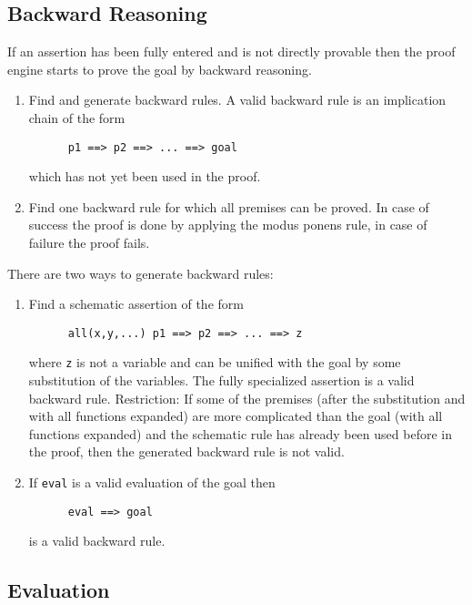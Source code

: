 \subsection{Backward Reasoning}

If an assertion has been fully entered and is not directly provable then the
proof engine starts to prove the goal by backward reasoning.

\begin{enumerate}
\item Find and generate backward rules. A valid backward rule is an implication
  chain of the form
  \begin{lstlisting}
      p1 ==> p2 ==> ... ==> goal
  \end{lstlisting}
  which has not yet been used in the proof.

\item Find one backward rule for which all premises can be proved. In case of
  success the proof is done by applying the modus ponens rule, in case of
  failure the proof fails.
\end{enumerate}

\noindent There are two ways to generate backward rules:
%
\begin{enumerate}
\item Find a schematic assertion of the form
  \begin{lstlisting}
      all(x,y,...) p1 ==> p2 ==> ... ==> z
  \end{lstlisting}
  where \lstinline!z! is not a variable and can be unified with the goal by
  some substitution of the variables. The fully specialized assertion is a
  valid backward rule. Restriction: If some of the premises (after the
  substitution and with all functions expanded) are more complicated than the
  goal (with all functions expanded) and the schematic rule has already been
  used before in the proof, then the generated backward rule is not valid.

\item If \lstinline!eval! is a valid evaluation of the goal then
  \begin{lstlisting}
      eval ==> goal
  \end{lstlisting}
  is a valid backward rule.
\end{enumerate}




\subsection{Evaluation}

